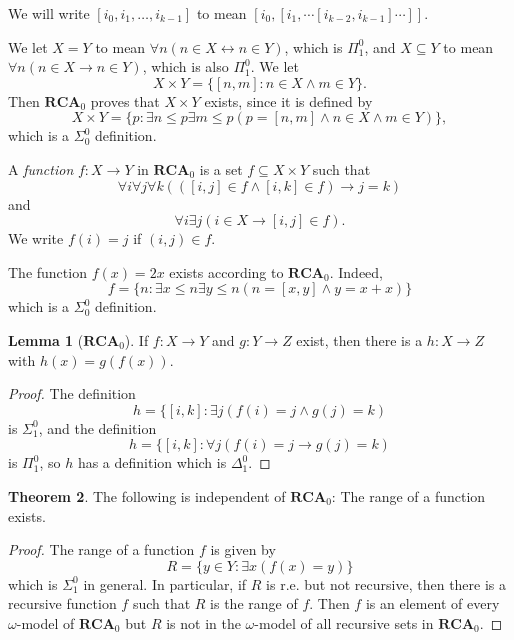 \documentclass[12pt]{book}
\newcommand{\RCA}{\mathbf{RCA}}
\newcommand{\dfn}[1]{\emph{#1}\index{#1}}
\theoremstyle{definition}
\newtheorem{theorem}{Theorem}[chapter]
\newtheorem{lemma}[theorem]{Lemma}
\newenvironment{definition}
  {\pushQED{\qed}\renewcommand{\qedsymbol}{$\diamondsuit$}\definitionx}
  {\popQED\endexamplex}
\newenvironment{example}
  {\pushQED{\qed}\renewcommand{\qedsymbol}{$\diamondsuit$}\examplex}
  {\popQED\endexamplex}
\begin{document}
We will write $[i_0, i_1, \dots, i_{k-1}]$ to mean $[i_0, [i_1, \cdots [i_{k-2}, i_{k-1}] \cdots ]]$.

We let $X = Y$ to mean $\forall n(n \in X \leftrightarrow n \in Y)$, which is $\Pi_1^0$, and $X \subseteq Y$ to mean $\forall n(n \in X \to n \in Y)$, which is also $\Pi_1^0$.
We let
$$X \times Y = \{[n, m]: n \in X \wedge m \in Y\}.$$
Then $\RCA_0$ proves that $X \times Y$ exists, since it is defined by
$$X \times Y = \{p: \exists n \leq p \exists m \leq p(p = [n, m] \wedge n \in X \wedge m \in Y)\},$$
which is a $\Sigma_0^0$ definition.

\begin{definition}
A \dfn{function} $f: X \to Y$ in $\RCA_0$ is a set $f \subseteq X \times Y$ such that
$$\forall i \forall j \forall k(([i,j] \in f \wedge [i,k]\in f) \to j = k)$$
and
$$\forall i \exists j(i \in X \to [i,j] \in f).$$
We write $f(i) = j$ if $(i, j) \in f$.
\end{definition}

\begin{example}
The function $f(x) = 2x$ exists according to $\RCA_0$.
Indeed,
$$f = \{n: \exists x \leq n \exists y \leq n(n = [x, y] \wedge y = x + x)\}$$
which is a $\Sigma_0^0$ definition.
\end{example}

\begin{lemma}[$\RCA_0$]
If $f: X \to Y$ and $g: Y \to Z$ exist, then there is a $h: X \to Z$ with $h(x) = g(f(x))$.
\end{lemma}
\begin{proof}
The definition
$$h = \{[i,k]: \exists j(f(i)=j \wedge g(j) = k)$$
is $\Sigma_1^0$, and the definition
$$h = \{[i,k]: \forall j(f(i)=j \to g(j) = k)$$
is $\Pi_1^0$, so $h$ has a definition which is $\Delta_1^0$.
\end{proof}

\begin{theorem}
The following is independent of $\RCA_0$: The range of a function exists.
\end{theorem}
\begin{proof}
The range of a function $f$ is given by
$$R = \{y \in Y: \exists x(f(x) = y)\}$$
which is $\Sigma_1^0$ in general.
In particular, if $R$ is r.e. but not recursive, then there is a recursive function $f$ such that $R$ is the range of $f$.
Then $f$ is an element of every $\omega$-model of $\RCA_0$ but $R$ is not in the $\omega$-model of all recursive sets in $\RCA_0$.
\end{proof}
\end{document}
